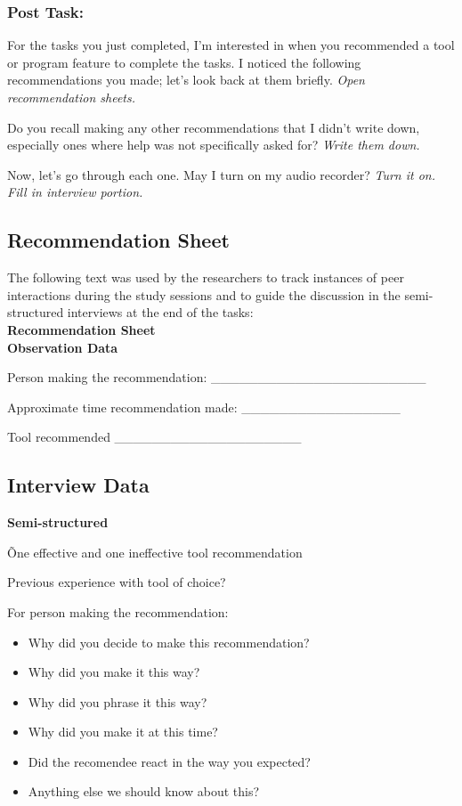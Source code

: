 \subsubsection*{\large Post Task:} 

For the tasks you just completed, I’m interested in when you recommended a tool or program feature to complete the tasks. I noticed the following recommendations you made; let’s look back at them briefly. 
\textit{Open recommendation sheets.}

Do you recall making any other recommendations that I didn't write down, especially ones where help was not specifically asked for? \textit{Write them down.}

Now, let’s go through each one. May I turn on my audio recorder? \textit{Turn it on. Fill in interview portion.}


\subsection{Recommendation Sheet}

The following text was used by the researchers to track instances of peer interactions during the study sessions and to guide the discussion in the semi-structured interviews at the end of the tasks: \\

\noindent
\textbf{\Large Recommendation Sheet} \\

\textbf{Observation Data}

Person making the recommendation:  \_\_\_\_\_\_\_\_\_\_\_\_\_\_\_\_\_\_\_\_\_\_\_

Approximate time recommendation made:  \_\_\_\_\_\_\_\_\_\_\_\_\_\_\_\_\_

Tool recommended \_\_\_\_\_\_\_\_\_\_\_\_\_\_\_\_\_\_\_\_ \\

\subsection{Interview Data}
\label{app-peer-interview}

\noindent
\textbf{Semi-structured}

\noindent
\~One effective and one ineffective tool recommendation

\noindent
Previous experience with tool of choice?

\noindent
For person making the recommendation:

\begin{itemize}
    \item Why did you decide to make this recommendation?
    \item Why did you make it this way? 
    \item Why did you phrase it this way?
    \item Why did you make it at this time?
    \item Did the recomendee react in the way you expected?
    \item Anything else we should know about this?
\end{itemize}

